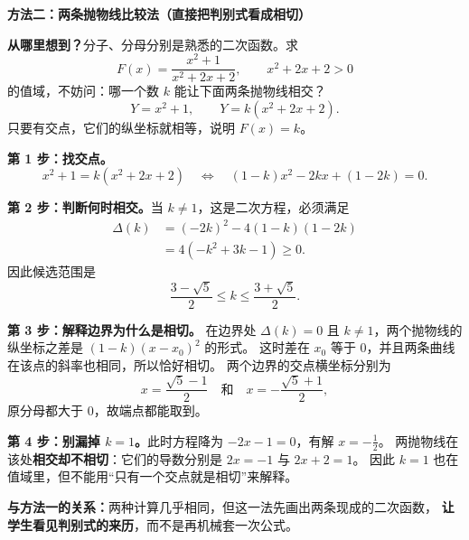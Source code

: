 \clearpage
\begin{proofbox}
\textbf{\textcolor{CProof}{方法二：两条抛物线比较法（直接把判别式看成相切）}}

\textbf{从哪里想到？}分子、分母分别是熟悉的二次函数。求
\[
 F(x)=\frac{x^2+1}{x^2+2x+2},\qquad x^2+2x+2>0
\]
的值域，不妨问：哪一个数 $k$ 能让下面两条抛物线相交？
\[
  Y=x^2+1,\qquad Y=k(x^2+2x+2).
\]
只要有交点，它们的纵坐标就相等，说明 $F(x)=k$。

\begin{center}\end{center}

\textbf{第 1 步：找交点。}
\[
  x^2+1=k(x^2+2x+2)
  \quad\Longleftrightarrow\quad
  (1-k)x^2-2kx+(1-2k)=0.
\]

\textbf{第 2 步：判断何时相交。}当 $k\ne1$，这是二次方程，必须满足
\[
  \begin{aligned}
  \Delta(k)&=(-2k)^2-4(1-k)(1-2k)\\
  &=4(-k^2+3k-1)\ge0.
  \end{aligned}
\]
因此候选范围是
\[
 \boxed{\frac{3-\sqrt5}{2}\le k\le\frac{3+\sqrt5}{2}}.
\]

\textbf{第 3 步：解释边界为什么是相切。}
在边界处 $\Delta(k)=0$ 且 $k\ne1$，两个抛物线的纵坐标之差是
$(1-k)(x-x_0)^2$ 的形式。
这时差在 $x_0$ 等于 $0$，并且两条曲线在该点的斜率也相同，所以恰好相切。
两个边界的交点横坐标分别为
\[
  x=\frac{\sqrt5-1}{2}\quad\text{和}\quad x=-\frac{\sqrt5+1}{2},
\]
原分母都大于 $0$，故端点都能取到。

\textbf{第 4 步：别漏掉 $k=1$。}此时方程降为 $-2x-1=0$，有解 $x=-\frac12$。
两抛物线在该处\textbf{相交却不相切}：它们的导数分别是 $2x=-1$ 与 $2x+2=1$。
因此 $k=1$ 也在值域里，但不能用“只有一个交点就是相切”来解释。

\textbf{与方法一的关系：}两种计算几乎相同，但这一法先画出两条现成的二次函数，
\textbf{让学生看见判别式的来历}，而不是再机械套一次公式。
\end{proofbox}



